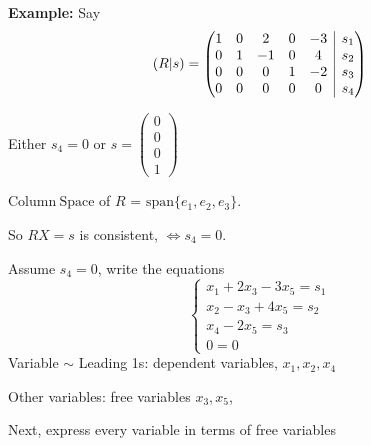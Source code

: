 \documentclass[12pt]{article}
\newcommand{\Span}{\mathrm{span}}
\newcommand{\ColSpace}{\mathrm{Column \ Space}}
\newcommand{\rvline}{\hspace*{-\arraycolsep}\vline\hspace*{-\arraycolsep}}
\begin{document}
{\color{Brown}
	\textbf{Example: }
	Say 
	\[
		(R|s) = 
		\begin{pmatrix}
			1 & 0 & 2 & 0 & -3 & \rvline & s_1	\\
			0 & 1 & -1 & 0 & 4 & \rvline & s_2	\\
			0 & 0 & 0 & 1 & -2 & \rvline & s_3	\\
			0 & 0 & 0 & 0 & 0  & \rvline & s_4	
		\end{pmatrix}
	\]

	Either $s_4 = 0$ or $s = \begin{pmatrix}0 \\ 0 \\ 0 \\ 1 \end{pmatrix}$

	$\ColSpace$ of $R$ = $\Span\{e_1, e_2, e_3\}$. 

	So $RX = s$ is consistent, $\Leftrightarrow s_4 = 0$. 

	Assume $s_4 = 0$, write the equations 
	\[
		\begin{cases}
			x_1 + 2x_3 - 3x_5 = s_1 \\
			x_2 - x_3 + 4x_5 = s_2	\\
			x_4 - 2x_5 = s_3	\\
			0 = 0
		\end{cases}
	\]
	Variable $\sim$ Leading 1s: dependent variables, $x_1, x_2, x_4$

	Other variables: free variables $x_3, x_5$, 

	Next, express every variable in terms of free variables 

}
\end{document}
